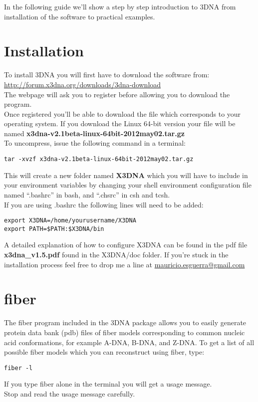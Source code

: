 \maketitle

\label{basics}
In the following guide we'll show  a step by step introduction to 3DNA
from installation of the software to practical examples.

\section{Installation}
To install 3DNA you will first have to download the software from:\\

\url{http://forum.x3dna.org/downloads/3dna-download}\\

\noindent The webpage will ask you to register before allowing you to
download the program.\\
Once registered you'll be able  to download the file which corresponds
to your  operating system.  If you download  the Linux  64-bit version
your     file     will            be            named
\textbf{x3dna-v2.1beta-linux-64bit-2012may02.tar.gz}\\
To uncompress, issue the following command in a terminal:
\begin{Verbatim}
tar -xvzf x3dna-v2.1beta-linux-64bit-2012may02.tar.gz
\end{Verbatim}
This will create a new folder named \textbf{X3DNA} which you will have
to  include  in your  environment  variables  by  changing your  shell
environment  configuration   file  named  ``.bashrc''   in  bash,  and
``.chsrc'' in csh and tcsh.\\ 
If you are using .bashrc the following lines will need to be added:
\begin{Verbatim}
export X3DNA=/home/yourusername/X3DNA
export PATH=$PATH:$X3DNA/bin
\end{Verbatim}
A detailed explanation  of how to configure X3DNA can  be found in the
pdf file  \textbf{x3dna\_v1.5.pdf} found  in the X3DNA/doc  folder. If
you're stuck in the installation process feel free to drop me a line at
\url{mauricio.esguerra@gmail.com}

\section{fiber}
The \textrm{fiber} program included in  the 3DNA package allows you to
easily  generate  protein  data  bank  (pdb)  files  of  fiber  models
corresponding to common nucleic acid conformations, for example A-DNA,
B-DNA, and  Z-DNA.  To get a  list of all possible  fiber models which
you can reconstruct using \textrm{fiber}, type:
\begin{Verbatim}
fiber -l
\end{Verbatim}
If you type \textrm{fiber} alone in the terminal you will get a usage
message.\\
Stop and read the usage message carefully.\\

